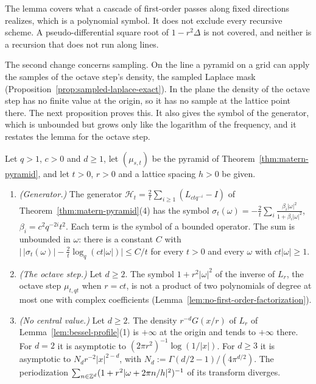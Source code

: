 The lemma covers what a cascade of first-order passes along fixed directions realizes, which is a
polynomial symbol. It does not exclude every recursive scheme. A pseudo-differential square root of
$1 - r^2\Delta$ is not covered, and neither is a recursion that does not run along lines.

The second change concerns sampling. On the line a pyramid on a grid can apply the samples of the
octave step's density, the sampled Laplace mask (Proposition~\ref{prop:sampled-laplace-exact}). In
the plane the density of the octave step has no finite value at the origin, so it has no sample at
the lattice point there. The next proposition proves this. It also gives the symbol of the
generator, which is unbounded but grows only like the logarithm of the frequency, and it restates
the lemma for the octave step.

\begin{proposition}
\label{prop:matern-generator-octave}

Let $q > 1$, $c > 0$ and $d \ge 1$, let $(\mu_{s,t})$ be the \Matern{} pyramid of
Theorem~\ref{thm:matern-pyramid}, and let $t > 0$, $r > 0$ and a lattice spacing $h > 0$ be given.
\begin{enumerate}
\item \emph{(Generator.)} The generator $\mathcal{H}_t = \frac2t\sum_{i \ge 1}(L_{ctq^{-i}} - I)$ of
Theorem~\ref{thm:matern-pyramid}(4) has the symbol
$\sigma_t(\omega) = -\frac2t\sum_i\frac{\beta_i|\omega|^2}{1 + \beta_i|\omega|^2}$, $\beta_i =
c^2q^{-2i}t^2$. Each term is the symbol of a bounded operator. The sum is unbounded in $\omega$:
there is a constant $C$ with
$\bigl|\,|\sigma_t(\omega)| - \frac2t\log_q(ct|\omega|)\bigr| \le C/t$ for every $t > 0$ and every
$\omega$ with $ct|\omega| \ge 1$.
\item \emph{(The octave step.)} Let $d \ge 2$. The symbol $1 + r^2|\omega|^2$ of the inverse of
$L_r$, the octave step $\mu_{t,qt}$ when $r = ct$, is not a product of two polynomials of degree at
most one with complex coefficients (Lemma~\ref{lem:no-first-order-factorization}).
\item \emph{(No central value.)} Let $d \ge 2$. The density $r^{-d}G(x/r)$ of $L_r$ of
Lemma~\ref{lem:bessel-profile}(1) is $+\infty$ at the origin and tends to $+\infty$ there. For
$d = 2$ it is asymptotic to $(2\pi r^2)^{-1}\log(1/|x|)$. For $d \ge 3$ it is asymptotic to
$N_dr^{-2}|x|^{2-d}$, with $N_d := \Gamma(d/2 - 1)/(4\pi^{d/2})$. The periodization
$\sum_{n \in \mathbb{Z}^d}(1 + r^2|\omega + 2\pi n/h|^2)^{-1}$ of its transform diverges.
\end{enumerate}
\end{proposition}

